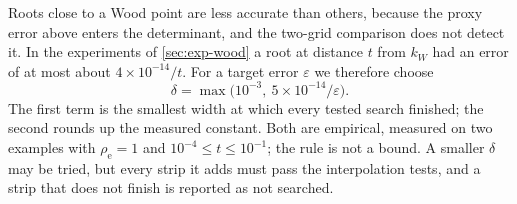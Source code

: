 Roots close to a Wood point are less accurate than others, because the
proxy error above enters the determinant, and the two-grid comparison does
not detect it. In the experiments of \cref{sec:exp-wood} a root at distance
$t$ from $k_W$ had an error of at most about $4\times10^{-14}/t$. For a target
error $\varepsilon$ we therefore choose
\[
  \delta=\max\bigl(10^{-3},\ 5\times10^{-14}/\varepsilon\bigr).
\]
The first term is the smallest width at which every tested search finished;
the second rounds up the measured constant. Both are empirical, measured on
two examples with $\rho_{\mathrm e}=1$ and $10^{-4}\le t\le10^{-1}$; the rule is not
a bound. A smaller $\delta$ may be tried, but every strip it adds must pass
the interpolation tests, and a strip that does not finish is reported as not
searched.

